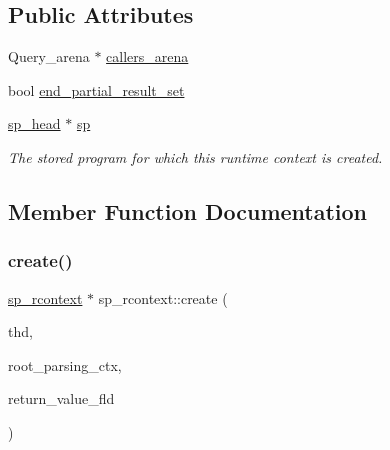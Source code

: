 \subsection*{Public Attributes}
\begin{DoxyCompactItemize}
\item 
Query\+\_\+arena $\ast$ \mbox{\hyperlink{classsp__rcontext_a01627fcdc799ecada127641cb3afe497}{callers\+\_\+arena}}
\item 
bool \mbox{\hyperlink{classsp__rcontext_ad25037c2c9c6e01ec67c2b19f9cdd7b8}{end\+\_\+partial\+\_\+result\+\_\+set}}
\item 
\mbox{\label{classsp__rcontext_a5a4d92f70877beec9eb109adc9ba662a}} 
\mbox{\hyperlink{classsp__head}{sp\+\_\+head}} $\ast$ \mbox{\hyperlink{classsp__rcontext_a5a4d92f70877beec9eb109adc9ba662a}{sp}}
\begin{DoxyCompactList}\small\item\em The stored program for which this runtime context is created. \end{DoxyCompactList}\end{DoxyCompactItemize}


\subsection{Member Function Documentation}
\mbox{\label{classsp__rcontext_afbac36121d1584e48b72f37dba00b172}} 
\subsubsection{\texorpdfstring{create()}{create()}}
{\footnotesize\ttfamily \mbox{\hyperlink{classsp__rcontext}{sp\+\_\+rcontext}} $\ast$ sp\+\_\+rcontext\+::create (\begin{DoxyParamCaption}\item[{T\+HD $\ast$}]{thd,  }\item[{const \mbox{\hyperlink{classsp__pcontext}{sp\+\_\+pcontext}} $\ast$}]{root\+\_\+parsing\+\_\+ctx,  }\item[{\mbox{\hyperlink{classField}{Field}} $\ast$}]{return\+\_\+value\+\_\+fld }\end{DoxyParamCaption})\hspace{0.3cm}{\ttfamily [static]}}

